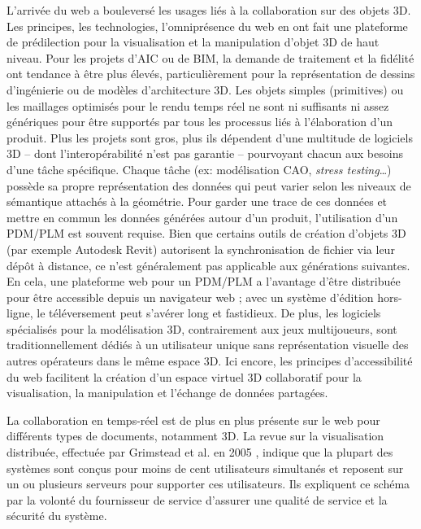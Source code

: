 L'arrivée du web a bouleversé les usages liés à la collaboration sur des objets 3D. 
Les principes, les technologies, l'omniprésence du web en ont fait une plateforme 
de prédilection pour la visualisation et la manipulation d'objet 3D de haut niveau.   
Pour les projets d'\gls{AIC} ou de \gls{BIM}, la demande de traitement et la fidélité 
ont tendance à être plus élevés, particulièrement pour la représentation de dessins 
d'ingénierie ou de modèles d'architecture 3D. 
Les objets simples (primitives) ou les maillages optimisés pour le rendu temps réel 
ne sont ni suffisants ni assez génériques pour être supportés par tous les 
processus liés à l'élaboration d'un produit. 
Plus les projets sont gros, plus ils dépendent d'une multitude de logiciels 3D --  
dont l'interopérabilité n'est pas garantie -- pourvoyant chacun aux besoins d'une 
tâche spécifique. 
Chaque tâche (ex: modélisation \gls{CAO}, \textit{stress testing}\ldots) possède sa 
propre représentation des données qui peut varier selon les niveaux de 
sémantique attachés à la géométrie. 
Pour garder une trace de ces données et mettre en commun les données 
générées autour d'un produit, l'utilisation d'un \gls{PDM}/\gls{PLM} est 
souvent requise. Bien que certains outils de création d'objets 3D (par exemple 
Autodesk Revit) autorisent la synchronisation de fichier via leur dépôt à distance, 
ce n'est généralement pas applicable aux générations suivantes. 
En cela, une plateforme web pour un \gls{PDM}/\gls{PLM} a 
l'avantage d'être distribuée pour être accessible depuis un navigateur web ; avec 
un système d'édition hors-ligne, le téléversement peut s'avérer long et fastidieux.
De plus, les logiciels spécialisés pour la modélisation 3D, contrairement aux jeux 
multijoueurs, sont traditionnellement dédiés à un utilisateur unique sans 
représentation visuelle des autres opérateurs dans le même espace 3D. 
Ici encore, les principes d'accessibilité du web facilitent la création d'un espace 
virtuel 3D collaboratif pour la visualisation, la manipulation et l'échange de
données partagées. 


La collaboration en temps-réel est de plus en plus présente sur le web pour 
différents types de documents, notamment 3D.
La revue sur la visualisation distribuée, effectuée par Grimstead et al. en 2005 
\cite{Grimstead2005}, indique que la plupart des systèmes sont conçus pour 
moins de cent 
utilisateurs simultanés et reposent sur un ou plusieurs serveurs pour supporter ces 
utilisateurs. 
Ils expliquent ce schéma par la volonté du fournisseur de service d'assurer une 
qualité de service et la sécurité du système. 

